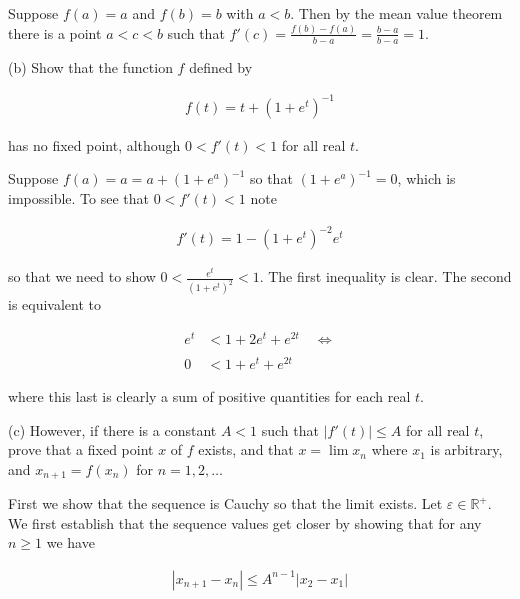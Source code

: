 \documentclass{article}
\begin{document}
  \vspace{1cm}

  Suppose $f(a)=a$ and $f(b)=b$ with $a<b$.  Then by the mean value theorem there is a point $a<c<b$ such that $f'(c) = \frac{f(b)-f(a)}{b-a}=\frac{b-a}{b-a}=1$.

  \vspace{1cm}

  {\Large \color{Sepia} (b) Show that the function $f$ defined by

  \begin{align*}
    f(t) = t+(1+e^t)^{-1}
  \end{align*}

  has no fixed point, although $0<f'(t)<1$ for all real $t$.

  }

  \vspace{1cm}

  Suppose $f(a) = a = a+(1+e^a)^{-1}$ so that $(1+e^a)^{-1}=0$, which is impossible.  To see that $0<f'(t)<1$ note

  \begin{align*}
    f'(t)=1-(1+e^t)^{-2}e^t
  \end{align*}

  so that we need to show $0 < \frac{e^t}{(1+e^t)^2} < 1$.  The first inequality is clear.  The second is equivalent to

  \begin{align*}
    e^t &< 1+2e^t +e^{2t} \quad \Leftrightarrow \\\\
    0 &< 1+e^t+e^{2t}
  \end{align*}

  where this last is clearly a sum of positive quantities for each real $t$.

  \vspace{1cm}

  {\Large \color{Sepia} (c) However, if there is a constant $A<1$ such that $|f'(t)|\leq A$ for all real $t$, prove that a fixed point $x$ of $f$ exists, and that $x=\lim x_n$ where $x_1$ is arbitrary, and $x_{n+1}=f(x_n)$ for $n=1,2,\dots$}

  \vspace{1cm}

  First we show that the sequence is Cauchy so that the limit exists.  Let $\varepsilon\in \mathbb R^+$.  We first establish that the sequence values get closer by showing that for any $n\geq 1$ we have

  \begin{align*}
    |x_{n+1}-x_n| \leq A^{n-1}|x_2-x_1|
  \end{align*}
\end{document}

